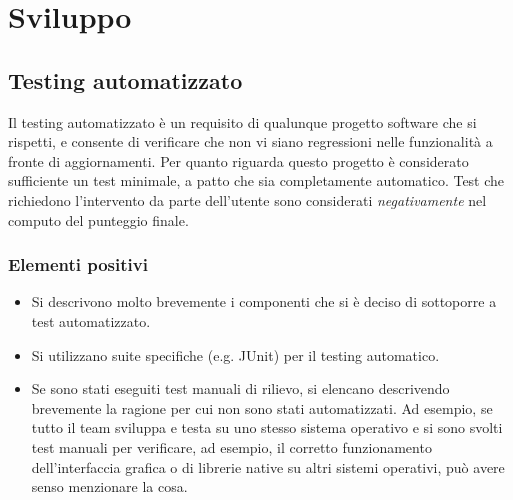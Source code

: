 \documentclass[a4paper,12pt]{report}
\begin{document}
\chapter{Sviluppo}
\section{Testing automatizzato}

Il testing automatizzato è un requisito di qualunque progetto software che si rispetti, e consente di verificare che non vi siano regressioni nelle funzionalità a fronte di aggiornamenti.
%
Per quanto riguarda questo progetto è considerato sufficiente un test minimale, a patto che sia completamente automatico.
%
Test che richiedono l'intervento da parte dell'utente sono considerati \textit{negativamente} nel computo del punteggio finale.

\subsection*{Elementi positivi}

\begin{itemize}
 \item Si descrivono molto brevemente i componenti che si è deciso di sottoporre a test automatizzato.
 \item Si utilizzano suite specifiche (e.g. JUnit) per il testing automatico.
 \item Se sono stati eseguiti test manuali di rilievo, si elencano descrivendo brevemente la ragione per cui non sono stati automatizzati. Ad esempio, se tutto il team sviluppa e testa su uno stesso sistema operativo e si sono svolti test manuali per verificare, ad esempio, il corretto funzionamento dell'interfaccia grafica o di librerie native su altri sistemi operativi, può avere senso menzionare la cosa.
\end{itemize}
\end{document}
